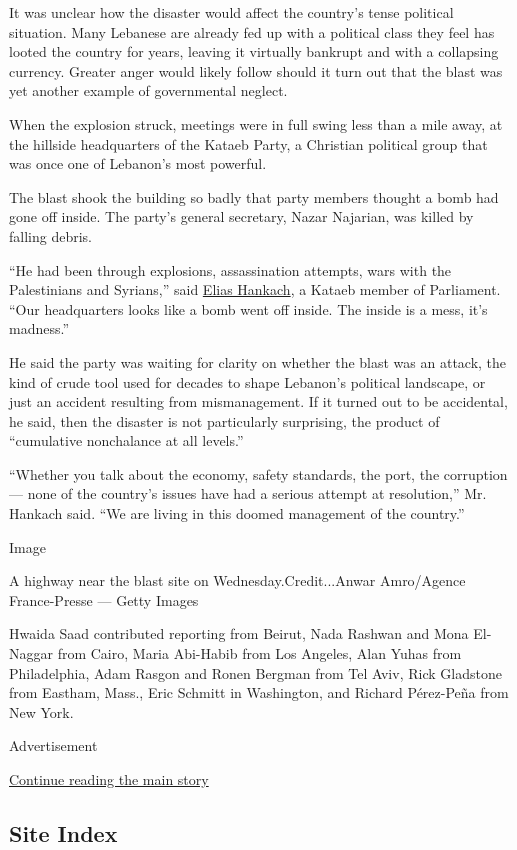 It was unclear how the disaster would affect the country's tense
political situation. Many Lebanese are already fed up with a political
class they feel has looted the country for years, leaving it virtually
bankrupt and with a collapsing currency. Greater anger would likely
follow should it turn out that the blast was yet another example of
governmental neglect.

When the explosion struck, meetings were in full swing less than a mile
away, at the hillside headquarters of the Kataeb Party, a Christian
political group that was once one of Lebanon's most powerful.

The blast shook the building so badly that party members thought a bomb
had gone off inside. The party's general secretary, Nazar Najarian, was
killed by falling debris.

``He had been through explosions, assassination attempts, wars with the
Palestinians and Syrians,'' said
\href{https://www.facebookcorewwwi.onion/EliasHankach2018/}{Elias
Hankach}, a Kataeb member of Parliament. ``Our headquarters looks like a
bomb went off inside. The inside is a mess, it's madness.''

He said the party was waiting for clarity on whether the blast was an
attack, the kind of crude tool used for decades to shape Lebanon's
political landscape, or just an accident resulting from mismanagement.
If it turned out to be accidental, he said, then the disaster is not
particularly surprising, the product of ``cumulative nonchalance at all
levels.''

``Whether you talk about the economy, safety standards, the port, the
corruption --- none of the country's issues have had a serious attempt
at resolution,'' Mr. Hankach said. ``We are living in this doomed
management of the country.''

Image

A highway near the blast site on Wednesday.Credit...Anwar Amro/Agence
France-Presse --- Getty Images

Hwaida Saad contributed reporting from Beirut, Nada Rashwan and Mona
El-Naggar from Cairo, Maria Abi-Habib from Los Angeles, Alan Yuhas from
Philadelphia, Adam Rasgon and Ronen Bergman from Tel Aviv, Rick
Gladstone from Eastham, Mass., Eric Schmitt in Washington, and Richard
Pérez-Peña from New York.

Advertisement

\protect\hyperlink{after-bottom}{Continue reading the main story}

\hypertarget{site-index}{%
\subsection{Site Index}\label{site-index}}

